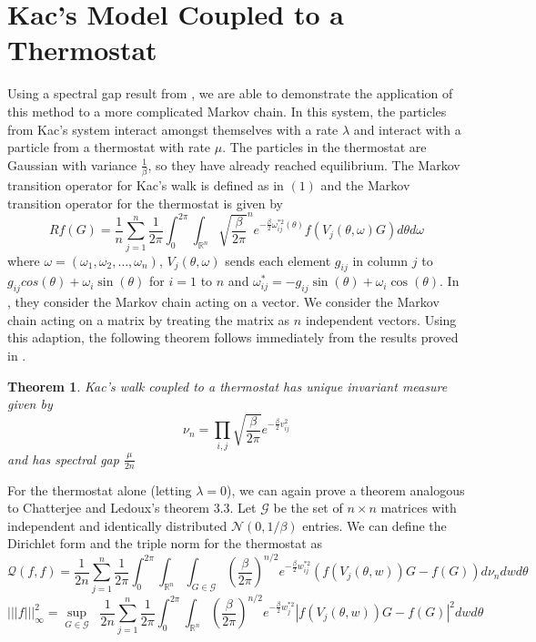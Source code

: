\documentclass[12pt]{report}
\newtheorem{thm}{Theorem}[section]
\newcommand{\tripNorm}[1]{|||#1|||_\infty}
\theoremstyle{definition}
\begin{document}
\section{Kac's Model Coupled to a Thermostat}
Using a spectral gap result from \cite{BLV}, we are able to demonstrate the application of this method to a more complicated Markov chain.  In this system, the particles from Kac's system interact amongst themselves with a rate $\lambda$ and interact with a particle from a thermostat  with rate $\mu$.  The particles in the thermostat are Gaussian with variance $\frac{1}{\beta}$, so they have already reached equilibrium.  The Markov transition operator for Kac's walk is defined as in $(1)$ and the Markov transition operator for the thermostat is given by \begin{equation}
Rf(G)=\frac{1}{n}\sum_{j=1}^n \frac{1}{2\pi}\int_{0}^{2\pi}\int_{\mathbb{R}^n}
 \sqrt{\frac{\beta}{2\pi}}^ne^{-\frac{\beta}{2}\omega_{ij}^{*2}(\theta)}f(V_j(\theta, \omega)G)d\theta d\omega
\end{equation}
where $\omega=(\omega_1,\omega_2,\dots,\omega_n)$, $V_j(\theta, \omega)$ sends each element $g_{ij}$ in column $j$ to $g_{ij}cos(\theta)+\omega_i\sin(\theta)$ for $i=1$ to $n$ and $\omega_{ij}^*=-g_{ij}\sin(\theta)+\omega_i\cos(\theta)$. 
In \cite{BLV}, they consider the Markov chain acting on a vector.  We consider the Markov chain acting on a matrix by treating the matrix as $n$ independent vectors.  Using this adaption, the following theorem follows immediately from the results proved in \cite{BLV}.  
\begin{thm}  Kac's walk coupled to a thermostat has unique invariant measure given by $$\nu_n=\prod_{i,j} \sqrt{\frac{\beta}{2\pi}}e^{-\frac{\beta}{2}v_{ij}^2}$$ and has spectral gap $\frac{\mu}{2n}$  \end{thm} 
For the thermostat alone (letting $\lambda=0$), we can again prove a theorem analogous to Chatterjee and Ledoux's theorem 3.3.  Let $\mathcal{G}$ be the set of $n\times n$ matrices with independent and identically distributed $\mathcal{N}(0,1/\beta)$ entries.  We can define the Dirichlet form and the triple norm for the thermostat as 
\begin{equation*}
\mathcal{Q}(f,f)=\frac{1}{2n}\sum_{j=1}^n\frac{1}{2\pi}\int_0^{2\pi}\int_{\mathbb{R}^n}\int_{G\in\mathcal{G}}\left(\frac{\beta}{2\pi}\right)^{n/2}e^{-\frac{\beta}{2}w_{ij}^{*2}}(f(V_j(\theta,w))G-f(G))d\nu_ndwd\theta
\end{equation*}
\begin{equation}
\tripNorm{f}^2=\sup_{G\in\mathcal{G}}\; \;\frac{1}{2n}\sum_{j=1}^n\frac{1}{2\pi}\int_0^{2\pi}\int_{\mathbb{R}^n}\left(\frac{\beta}{2\pi}\right)^{n/2}e^{-\frac{\beta}{2}w_j^{*2}}|f(V_j(\theta,w))G-f(G)|^2dwd\theta
\end{equation}
\end{document}
